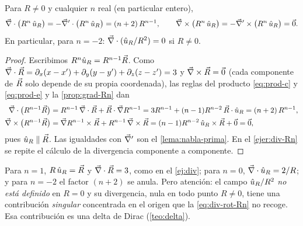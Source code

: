 \begin{proposicion}\label{prop:div-rot-Rn}
Para $R\neq0$ y cualquier $n$ real (en particular entero),
\begin{equation}\label{eq:div-rot-Rn}
  \vec{\nabla}\cdot\bigl(R^{n}\,\hat{u}_{R}\bigr)=-\vec{\nabla}'\cdot\bigl(R^{n}\,\hat{u}_{R}\bigr)=(n+2)\,R^{n-1},
  \qquad
  \vec{\nabla}\times\bigl(R^{n}\,\hat{u}_{R}\bigr)=-\vec{\nabla}'\times\bigl(R^{n}\,\hat{u}_{R}\bigr)=\vec{0}.
\end{equation}
En particular, para $n=-2$: $\vec{\nabla}\cdot(\hat{u}_{R}/R^{2})=0$ si $R\neq0$.
\end{proposicion}
\begin{proof}
Escribimos $R^{n}\hat{u}_{R}=R^{n-1}\vec{R}$. Como $\vec{\nabla}\cdot\vec{R}=\partial_x(x-x')+\partial_y(y-y')+\partial_z(z-z')=3$ y
$\vec{\nabla}\times\vec{R}=\vec{0}$ (cada componente de $\vec{R}$ solo depende de su propia
coordenada), las reglas del producto \eqref{eq:prod-c} y \eqref{eq:prod-e} y la
\cref{prop:grad-Rn} dan
\begin{align*}
  \vec{\nabla}\cdot\bigl(R^{n-1}\vec{R}\bigr)&=R^{n-1}\,\vec{\nabla}\cdot\vec{R}+\vec{R}\cdot\vec{\nabla} R^{n-1}
    =3R^{n-1}+(n-1)R^{n-2}\,\vec{R}\cdot\hat{u}_{R}=(n+2)\,R^{n-1},\\
  \vec{\nabla}\times\bigl(R^{n-1}\vec{R}\bigr)&=\vec{\nabla} R^{n-1}\times\vec{R}+R^{n-1}\,\vec{\nabla}\times\vec{R}
    =(n-1)R^{n-2}\,\hat{u}_{R}\times\vec{R}+\vec{0}=\vec{0},
\end{align*}
pues $\hat{u}_{R}\parallel\vec{R}$. Las igualdades con $\vec{\nabla}'$ son el \cref{lema:nabla-prima}.
En el \cref{ejer:div-Rn} se repite el cálculo de la divergencia componente a
componente.
\end{proof}

\begin{observacion}[Comprobaciones y el caso $n=-2$]\label{obs:casos-n}
Para $n=1$, $R\,\hat{u}_{R}=\vec{R}$ y $\vec{\nabla}\cdot\vec{R}=3$, como en el \cref{ej:div}; para
$n=0$, $\vec{\nabla}\cdot\hat{u}_{R}=2/R$; y para $n=-2$ el factor $(n+2)$ se anula. Pero
atención: el campo $\hat{u}_{R}/R^{2}$ \emph{no está definido} en $R=0$ y su divergencia,
nula en todo punto $R\neq0$, tiene una contribución \emph{singular} concentrada
en el origen que la \cref{eq:div-rot-Rn} no recoge. Esa contribución es una delta de
Dirac (\cref{teo:delta}).
\end{observacion}

